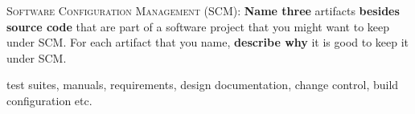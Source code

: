 \documentclass[11pt]{exam}
\newcommand{\Comment}[1]{}
\begin{document}
\begin{questions}
\begin{parts}
   
\Comment{
\part [2] One of the main practices of XP is test-driven development (TDD). In fact, the authors of Extreme Software Engineering claim that TDD helps you write better code. Give two reasons for their claim.

\begin{solution} [1 in]
 Testing forces simplicity
 Testing clarifies the task at hand
 Testing frees you from on-the-fly editing
\end{solution}
}

\end{parts}

\question[3] \textsc{Software Configuration Management (SCM):} \textbf{Name three} artifacts \textbf{besides source code} that are part of a software project that you might want to keep under SCM. For each artifact that you name, \textbf{describe why} it is good to keep it under SCM.
  \begin{solution}[2.4 in]
    test suites, manuals, requirements, design documentation, change control, build configuration etc.
  \end{solution}

\Comment{
\begin{parts}

\part[2] \textbf{Name two goals} of proper Software Configuration Management.
  \begin{solution}[2 in]
    To keep track of how software changes over time and to be able to reproduce
    any version of the software. 
  \end{solution}
\end{parts}
}


\end{questions}
\end{document}
